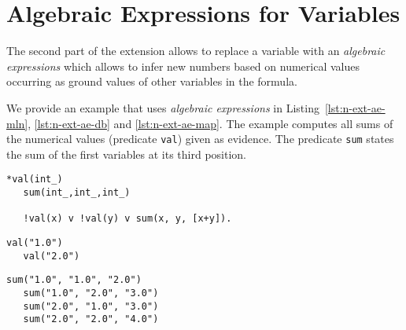 \documentclass[11pt,titlepage,oneside,openany]{book}
\begin{document}
\section{Algebraic Expressions for Variables}
The second part of the extension allows to replace a variable with an \textit{algebraic expressions} which allows to infer new numbers based on numerical values occurring as ground values of other variables in the formula.

We provide an example that uses \textit{algebraic expressions} in Listing~\ref{lst:n-ext-ae-mln}, \ref{lst:n-ext-ae-db} and \ref{lst:n-ext-ae-map}. The example computes all sums of the numerical values (predicate \texttt{val}) given as evidence. The predicate \texttt{sum} states the sum of the first variables at its third position.

\begin{lstlisting}[caption=Example for algebraic expressions: prog.mln,label=lst:n-ext-ae-mln]
   *val(int_)
   sum(int_,int_,int_)

   !val(x) v !val(y) v sum(x, y, [x+y]).
\end{lstlisting} 

\begin{lstlisting}[caption=Example using algebraic expressions: evidence.mln,label=lst:n-ext-ae-db]
   val("1.0")
   val("2.0")
\end{lstlisting}

\begin{lstlisting}[caption=Example for algebraic expressions: out.db (MAP state),label=lst:n-ext-ae-map]
   sum("1.0", "1.0", "2.0")
   sum("1.0", "2.0", "3.0")
   sum("2.0", "1.0", "3.0")
   sum("2.0", "2.0", "4.0")
\end{lstlisting}


\newpage


\pagestyle{empty}
\end{document}
